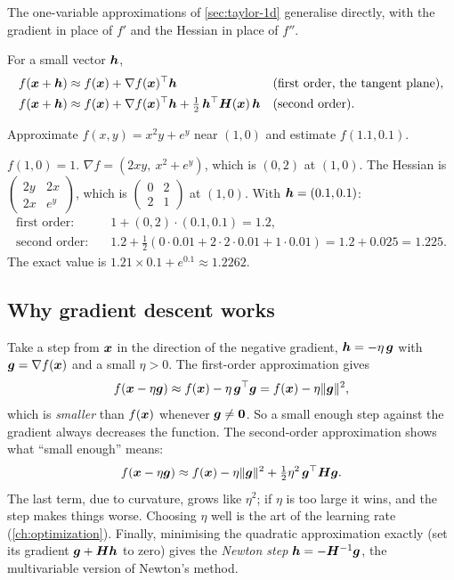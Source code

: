 The one-variable approximations of \cref{sec:taylor-1d} generalise directly,
with the gradient in place of $f'$ and the Hessian in place of $f''$.

\begin{theorem}\label{thm:taylor-multi}
For a small vector $\bm{h}$,
\begin{align*}
  f(\bm{x} + \bm{h}) &\approx f(\bm{x}) + \nabla f(\bm{x})^\top\bm{h}
    && \text{(first order, the tangent plane)},\\
  f(\bm{x} + \bm{h}) &\approx f(\bm{x}) + \nabla f(\bm{x})^\top\bm{h}
    + \tfrac12\,\bm{h}^\top\bm{H}(\bm{x})\,\bm{h}
    && \text{(second order)}.
\end{align*}
\end{theorem}

\begin{example}
Approximate $f(x, y) = x^2y + e^y$ near $(1, 0)$ and estimate $f(1.1, 0.1)$.

\sol $f(1, 0) = 1$. $\nabla f = (2xy,\ x^2 + e^y)$, which is $(0, 2)$ at $(1,0)$.
The Hessian is $\left(\begin{smallmatrix} 2y & 2x\\ 2x &
e^y\end{smallmatrix}\right)$, which is $\left(\begin{smallmatrix} 0 & 2\\ 2 &
1\end{smallmatrix}\right)$ at $(1, 0)$. With $\bm{h} = (0.1, 0.1)$:
\begin{align*}
  \text{first order:}\quad & 1 + (0, 2)\cdot(0.1, 0.1) = 1.2,\\
  \text{second order:}\quad & 1.2 + \tfrac12\left(0\cdot0.01 + 2\cdot2\cdot0.01
    + 1\cdot0.01\right) = 1.2 + 0.025 = 1.225 .
\end{align*}
The exact value is $1.21\times0.1 + e^{0.1} \approx 1.2262$.
\end{example}

\subsection{Why gradient descent works}

Take a step from $\bm{x}$ in the direction of the negative gradient,
$\bm{h} = -\eta\,\bm{g}$ with $\bm{g} = \nabla f(\bm{x})$ and a small $\eta > 0$. The
first-order approximation gives
\[
  f(\bm{x} - \eta\bm{g}) \approx f(\bm{x}) - \eta\,\bm{g}^\top\bm{g} = f(\bm{x}) - \eta\lVert\bm{g}\rVert^2 ,
\]
which is \emph{smaller} than $f(\bm{x})$ whenever $\bm{g} \neq \bm{0}$. So a small enough
step against the gradient always decreases the function. The second-order
approximation shows what ``small enough'' means:
\[
  f(\bm{x} - \eta\bm{g}) \approx f(\bm{x}) - \eta\lVert\bm{g}\rVert^2
  + \tfrac12\eta^2\,\bm{g}^\top\bm{H}\bm{g} .
\]
The last term, due to curvature, grows like $\eta^2$; if $\eta$ is too large it
wins, and the step makes things worse. Choosing $\eta$ well is the art of the
learning rate (\cref{ch:optimization}). Finally, minimising the quadratic
approximation exactly (set its gradient $\bm{g} + \bm{H}\bm{h}$ to zero) gives the
\emph{Newton step} $\bm{h} = -\bm{H}^{-1}\bm{g}$, the multivariable version of Newton's
method.

